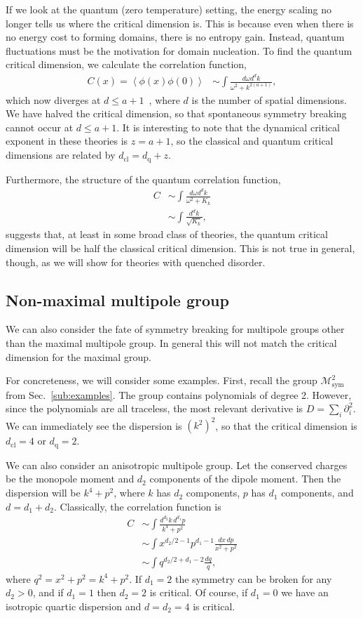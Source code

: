 \documentclass[twocolumn, longbibliography]{revtex4-2}
\newcommand{\nn}{\nonumber\\}
\newcommand{\cl}{\text{cl}}
\newcommand{\q}{\text{q}}
\begin{document}
If we look at the quantum (zero temperature) setting, the energy scaling no longer tells us where the critical dimension is. This is because even when there is no energy cost to forming domains, there is no entropy gain. Instead, quantum fluctuations must be the motivation for domain nucleation. To find the quantum critical dimension, we calculate the correlation function,
\begin{align}
C(x) = \left\langle \phi(x) \phi(0) \right\rangle &\sim \int \frac{d\omega d^dk}{\omega^2 + k^{2( a + 1 )}},
\end{align}
which now diverges at $d\le a+1$~\cite{Griffin2015}, where $d$ is the number of spatial dimensions. We have halved the critical dimension, so that spontaneous symmetry breaking cannot occur at $d\le a+1$. It is interesting to note that the dynamical critical exponent in these theories is $z = a+1$, so the classical and quantum critical dimensions are related by $d_\text{cl} = d_\text{q} + z$.

Furthermore, the structure of the quantum correlation function,
\begin{align}
C &\sim \int \frac{d\omega d^dk}{\omega^2 + K_k}\nn
&\sim \int \frac{d^dk}{\sqrt{K_k}},
\end{align}
suggests that, at least in some broad class of theories, the quantum critical dimension will be half the classical critical dimension. This is not true in general, though, as we will show for theories with quenched disorder.

\subsection{Non-maximal multipole group} \label{sub:nonmax}

We can also consider the fate of symmetry breaking for multipole groups other than the maximal multipole group. In general this will not match the critical dimension for the maximal group. 

For concreteness, we will consider some examples. First, recall the group $\mathcal{M}^2_\text{sym}$ from Sec.~\ref{sub:examples}. The group contains polynomials of degree 2. However, since the polynomials are all traceless, the most relevant derivative is $D = \sum_i \partial^2_i$.  We can immediately see the dispersion is $(k^2)^2$, so that the critical dimension is $d_\cl = 4$ or $d_\q = 2$.

We can also consider an anisotropic multipole group. 
Let the conserved charges be the monopole moment and $d_2$ components of the dipole moment. Then the dispersion will be $k^4 + p^2$, where $k$ has $d_2$ components, $p$ has $d_1$ components, and $d = d_1+d_2$. Classically, the correlation function is
\begin{align}
C &\sim \int \frac{d^{d_2} k \, d^{d_1} p}{k^4 + p^2}\nn
&\sim \int x^{d_2/2 -1} p^{d_1-1} \frac{dx\, dp}{x^2 +p^2} \nn
&\sim \int q^{d_2/2 + d_1 - 2}\frac{dq}{q},
\end{align}
where $q^2 = x^2 + p^2 = k^4 + p^2$. 
If $d_1=2$ the symmetry can be broken for any $d_2>0$, and if $d_1=1$ then $d_2=2$  is critical. Of course, if $d_1=0$ we have an isotropic quartic dispersion and $d=d_2=4$ is critical. 
\end{document}
